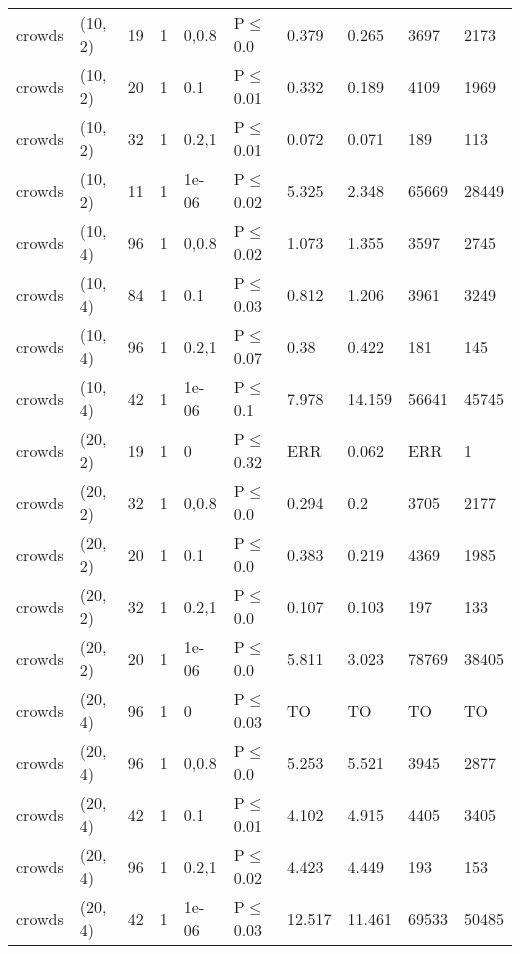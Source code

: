 \begin{longtable}{llrrllllll}
 crowds        & (10, 2)  &     	19 & 1 & 0,0.8 & P$\leq$0.0   & 0.379    & 0.265    & 3697    & 2173    \\
 crowds        & (10, 2)  &     	20 & 1 & 0.1   & P$\leq$0.01  & 0.332    & 0.189    & 4109    & 1969    \\
 crowds        & (10, 2)  &     	32 & 1 & 0.2,1 & P$\leq$0.01  & 0.072    & 0.071    & 189     & 113     \\
 crowds        & (10, 2)  &     	11 & 1 & 1e-06 & P$\leq$0.02  & 5.325    & 2.348    & 65669   & 28449   \\
 crowds        & (10, 4)  &     	96 & 1 & 0,0.8 & P$\leq$0.02  & 1.073    & 1.355    & 3597    & 2745    \\
 crowds        & (10, 4)  &     	84 & 1 & 0.1   & P$\leq$0.03  & 0.812    & 1.206    & 3961    & 3249    \\
 crowds        & (10, 4)  &     	96 & 1 & 0.2,1 & P$\leq$0.07  & 0.38     & 0.422    & 181     & 145     \\
 crowds        & (10, 4)  &     	42 & 1 & 1e-06 & P$\leq$0.1   & 7.978    & 14.159   & 56641   & 45745   \\
 crowds        & (20, 2)  &     	19 & 1 & 0     & P$\leq$0.32  & ERR      & 0.062    & ERR     & 1       \\
 crowds        & (20, 2)  &     	32 & 1 & 0,0.8 & P$\leq$0.0   & 0.294    & 0.2      & 3705    & 2177    \\
 crowds        & (20, 2)  &     	20 & 1 & 0.1   & P$\leq$0.0   & 0.383    & 0.219    & 4369    & 1985    \\
 crowds        & (20, 2)  &     	32 & 1 & 0.2,1 & P$\leq$0.0   & 0.107    & 0.103    & 197     & 133     \\
 crowds        & (20, 2)  &     	20 & 1 & 1e-06 & P$\leq$0.0   & 5.811    & 3.023    & 78769   & 38405   \\
 crowds        & (20, 4)  &     	96 & 1 & 0     & P$\leq$0.03  & TO       & TO       & TO      & TO      \\
 crowds        & (20, 4)  &     	96 & 1 & 0,0.8 & P$\leq$0.0   & 5.253    & 5.521    & 3945    & 2877    \\
 crowds        & (20, 4)  &     	42 & 1 & 0.1   & P$\leq$0.01  & 4.102    & 4.915    & 4405    & 3405    \\
 crowds        & (20, 4)  &     	96 & 1 & 0.2,1 & P$\leq$0.02  & 4.423    & 4.449    & 193     & 153     \\
 crowds        & (20, 4)  &     	42 & 1 & 1e-06 & P$\leq$0.03  & 12.517   & 11.461   & 69533   & 50485   \\

\end{longtable}
